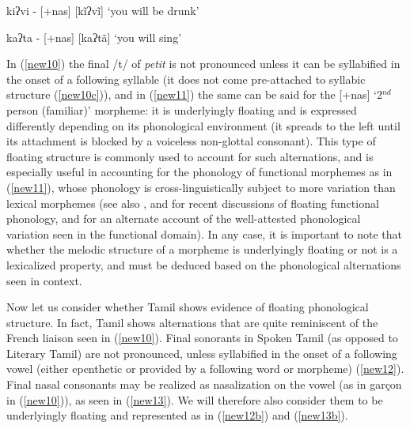 \documentclass[output=paper,colorlinks,citecolor=brown,
]{langscibook}
\begin{document}
\begin{exe}
\ex \label{new11}
\begin{xlist}
\ex \label{new11a}
kiʔvi - [+nas] 		\hspace{2cm}	[kĩʔvĩ]      \hspace{2cm}    		‘you will be drunk’

{\ex \label{new11b}
kaʔta - [+nas] 		\hspace{2cm}	[kaʔtã]	        \hspace{2cm} 		‘you will sing’} 

\end{xlist}
\end{exe}

In (\ref{new10}) the final /t/ of \textit{petit} is not pronounced unless it can be syllabified in the onset of a following syllable (it does not come pre-attached to syllabic structure (\ref{new10c})), and in (\ref{new11}) the same can be said for the [+nas] ‘2$^{nd}$ person (familiar)’ morpheme: it is underlyingly floating and is expressed differently depending on its phonological environment (it spreads to the left until its attachment is blocked by a voiceless non-glottal consonant). This type of floating structure is commonly used to account for such alternations, and is especially useful in accounting for the phonology of functional morphemes as in (\ref{new11}), whose phonology is cross-linguistically subject to more variation than lexical morphemes (see also \citealt{FaustUlfsbjorninn2018}, and \citealt{newell2019functional} for recent discussions of floating functional phonology, and \citealt{Selkirk1996} for an alternate account of the well-attested phonological variation seen in the functional domain). In any case, it is important to note that whether the melodic structure of a morpheme is underlyingly floating or not is a lexicalized property, and must be deduced based on the phonological alternations seen in context. 

Now let us consider whether Tamil shows evidence of floating phonological structure. In fact, Tamil shows alternations that are quite reminiscent of the French liaison seen in (\ref{new10}). Final sonorants in Spoken Tamil (as opposed to Literary Tamil) are not pronounced, unless syllabified in the onset of a following vowel (either epenthetic or provided by a following word or morpheme) (\ref{new12}). Final nasal consonants may be realized as nasalization on the vowel (as in garçon in (\ref{new10})), as seen in (\ref{new13}). We will therefore also consider them to be underlyingly floating and represented as in (\ref{new12b}) and (\ref{new13b}).
\end{document}
